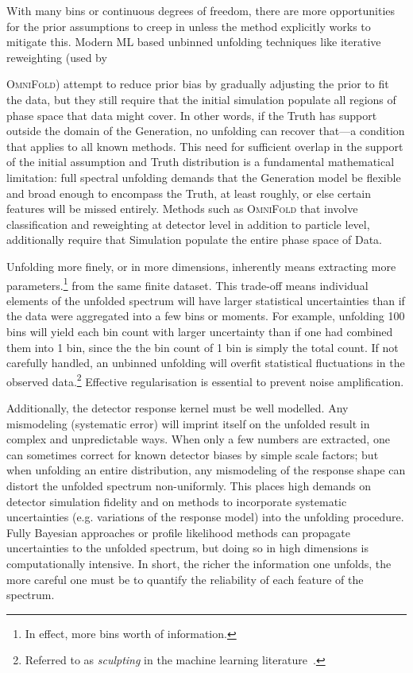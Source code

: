         With many bins or continuous degrees of freedom, there are more opportunities for the prior assumptions to creep in unless the method explicitly works to mitigate this.
        Modern ML based unbinned unfolding techniques like iterative reweighting (used by {\textsc{OmniFold}) attempt to reduce prior bias by gradually adjusting the prior to fit the data, but they still require that the initial simulation populate all regions of phase space that data might cover.
        In other words, if the Truth has support outside the domain of the Generation, no unfolding can recover that---a condition that applies to all known methods.
        This need for sufficient overlap in the support of the initial assumption and Truth distribution is a fundamental mathematical limitation: full spectral unfolding demands that the Generation model be flexible and broad enough to encompass the Truth, at least roughly, or else certain features will be missed entirely.
        Methods such as \textsc{OmniFold} that involve classification and reweighting at detector level in addition to particle level, additionally require that Simulation populate the entire phase space of Data.

        Unfolding more finely, or in more dimensions, inherently means extracting more parameters.\footnote{In effect, more bins worth of information.} from the same finite dataset.
        This trade-off means individual elements of the unfolded spectrum will have larger statistical uncertainties than if the data were aggregated into a few bins or moments.
        For example, unfolding 100 bins will yield each bin count with larger uncertainty than if one had combined them into 1 bin, since the the bin count of 1 bin is simply the total count.
        If not carefully handled, an unbinned unfolding will overfit statistical fluctuations in the observed data.\footnote{Referred to as \emph{sculpting} in the machine learning literature~\cite{Corso2023, ParticleDataGroup:2022pth}.}
        Effective regularisation is essential to prevent noise amplification.
        
        Additionally, the detector response kernel must be well modelled.
        Any mismodeling (systematic error) will imprint itself on the unfolded result in complex and unpredictable ways.
        When only a few numbers are extracted, one can sometimes correct for known detector biases by simple scale factors; but when unfolding an entire distribution, any mismodeling of the response shape can distort the unfolded spectrum non-uniformly.
        This places high demands on detector simulation fidelity and on methods to incorporate systematic uncertainties (e.g. variations of the response model) into the unfolding procedure.
        Fully Bayesian approaches or profile likelihood methods can propagate uncertainties to the unfolded spectrum, but doing so in high dimensions is computationally intensive.
        In short, the richer the information one unfolds, the more careful one must be to quantify the reliability of each feature of the spectrum.

}
